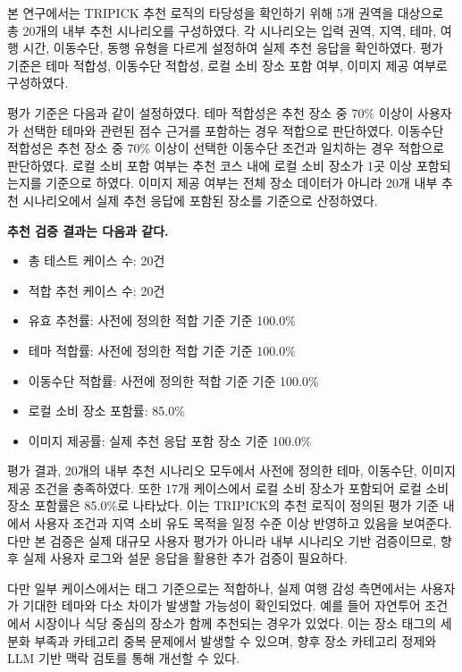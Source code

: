 \documentclass[10pt,a4paper]{article}
\begin{document}
본 연구에서는 TRIPICK 추천 로직의 타당성을 확인하기 위해 5개 권역을 대상으로 총 20개의 내부 추천 시나리오를 구성하였다. 각 시나리오는 입력 권역, 지역, 테마, 여행 시간, 이동수단, 동행 유형을 다르게 설정하여 실제 추천 응답을 확인하였다. 평가 기준은 테마 적합성, 이동수단 적합성, 로컬 소비 장소 포함 여부, 이미지 제공 여부로 구성하였다.

평가 기준은 다음과 같이 설정하였다. 테마 적합성은 추천 장소 중 70\% 이상이 사용자가 선택한 테마와 관련된 점수 근거를 포함하는 경우 적합으로 판단하였다. 이동수단 적합성은 추천 장소 중 70\% 이상이 선택한 이동수단 조건과 일치하는 경우 적합으로 판단하였다. 로컬 소비 포함 여부는 추천 코스 내에 로컬 소비 장소가 1곳 이상 포함되는지를 기준으로 하였다. 이미지 제공 여부는 전체 장소 데이터가 아니라 20개 내부 추천 시나리오에서 실제 추천 응답에 포함된 장소를 기준으로 산정하였다.

\noindent
\textbf{추천 검증 결과는 다음과 같다.}

\begin{itemize}[leftmargin=2em]
\item 총 테스트 케이스 수: 20건
\item 적합 추천 케이스 수: 20건
\item 유효 추천률: 사전에 정의한 적합 기준 기준 100.0\%
\item 테마 적합률: 사전에 정의한 적합 기준 기준 100.0\%
\item 이동수단 적합률: 사전에 정의한 적합 기준 기준 100.0\%
\item 로컬 소비 장소 포함률: 85.0\%
\item 이미지 제공률: 실제 추천 응답 포함 장소 기준 100.0\%
\end{itemize}

평가 결과, 20개의 내부 추천 시나리오 모두에서 사전에 정의한 테마, 이동수단, 이미지 제공 조건을 충족하였다. 또한 17개 케이스에서 로컬 소비 장소가 포함되어 로컬 소비 장소 포함률은 85.0\%로 나타났다. 이는 TRIPICK의 추천 로직이 정의된 평가 기준 내에서 사용자 조건과 지역 소비 유도 목적을 일정 수준 이상 반영하고 있음을 보여준다. 다만 본 검증은 실제 대규모 사용자 평가가 아니라 내부 시나리오 기반 검증이므로, 향후 실제 사용자 로그와 설문 응답을 활용한 추가 검증이 필요하다.

다만 일부 케이스에서는 태그 기준으로는 적합하나, 실제 여행 감성 측면에서는 사용자가 기대한 테마와 다소 차이가 발생할 가능성이 확인되었다. 예를 들어 자연투어 조건에서 시장이나 식당 중심의 장소가 함께 추천되는 경우가 있었다. 이는 장소 태그의 세분화 부족과 카테고리 중복 문제에서 발생할 수 있으며, 향후 장소 카테고리 정제와 LLM 기반 맥락 검토를 통해 개선할 수 있다.
\end{document}
